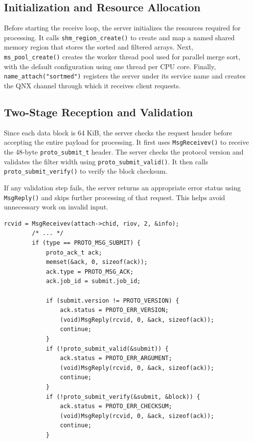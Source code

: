 \documentclass[12pt,a4paper,oneside]{report}
\begin{document}
\subsection{Initialization and Resource Allocation}

Before starting the receive loop, the server initializes the resources required for processing. It calls \texttt{shm\_region\_create()} to create and map a named shared memory region that stores the sorted and filtered arrays. Next, \texttt{ms\_pool\_create()} creates the worker thread pool used for parallel merge sort, with the default configuration using one thread per CPU core. Finally, \texttt{name\_attach("sortmed")} registers the server under its service name and creates the QNX channel through which it receives client requests.

\subsection{Two-Stage Reception and Validation}

Since each data block is 64 KiB, the server checks the request header before accepting the entire payload for processing. It first uses \texttt{MsgReceivev()} to receive the 48-byte \texttt{proto\_submit\_t} header. The server checks the protocol version and validates the filter width using \texttt{proto\_submit\_valid()}. It then calls \texttt{proto\_submit\_verify()} to verify the block checksum.

If any validation step fails, the server returns an appropriate error status using \texttt{MsgReply()} and skips further processing of that request. This helps avoid unnecessary work on invalid input.

\begin{lstlisting}[caption={Receiving and validating the request header}, label={lst:server-receive}]
        rcvid = MsgReceivev(attach->chid, riov, 2, &info);
        /* ... */
        if (type == PROTO_MSG_SUBMIT) {
            proto_ack_t ack;
            memset(&ack, 0, sizeof(ack));
            ack.type = PROTO_MSG_ACK;
            ack.job_id = submit.job_id;

            if (submit.version != PROTO_VERSION) {
                ack.status = PROTO_ERR_VERSION;
                (void)MsgReply(rcvid, 0, &ack, sizeof(ack));
                continue;
            }
            if (!proto_submit_valid(&submit)) {
                ack.status = PROTO_ERR_ARGUMENT;
                (void)MsgReply(rcvid, 0, &ack, sizeof(ack));
                continue;
            }
            if (!proto_submit_verify(&submit, &block)) {
                ack.status = PROTO_ERR_CHECKSUM;
                (void)MsgReply(rcvid, 0, &ack, sizeof(ack));
                continue;
            }
\end{lstlisting}
\end{document}
